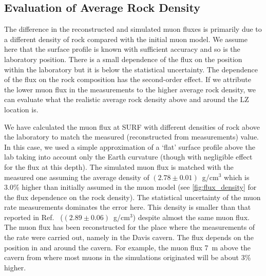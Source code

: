 \subsection{Evaluation of Average Rock Density}

The difference in the reconstructed and simulated muon fluxes is primarily due to a different density of rock compared with the initial muon model. We assume here that the surface profile is known with sufficient accuracy and so is the laboratory position. There is a small dependence of the flux on the position within the laboratory but it is below the statistical uncertainty. The dependence of the flux on the rock composition has the second-order effect. If we attribute the lower muon flux in the measurements to the higher average rock density, we can evaluate what the realistic average rock density above and around the LZ location is. 

We have calculated the muon flux at SURF with different densities of rock above the laboratory to match the measured (reconstructed from measurements) value. In this case, we used a simple approximation of a `flat' surface profile above the lab taking into account only the Earth curvature (though with negligible effect for the flux at this depth). The simulated muon flux is matched with the measured one assuming the average density of $(2.78 \pm 0.01)$~g/cm$^3$ which is 3.0\% higher than initially assumed in the muon model (see \autoref{fig:flux_density} for the flux dependence on the rock density). The statistical uncertainty of the muon rate measurements dominates the error here. This density is smaller than that reported in Ref.~\cite{majorana} ($(2.89 \pm 0.06)$~g/cm$^3$) despite almost the same muon flux. 
The muon flux has been reconstructed for the place where the measurements of the rate were carried out, namely in the Davis cavern. The flux depends on the position in and around the cavern. For example, the muon flux 7~m above the cavern from where most muons in the simulations originated will be about 3\% higher. 

